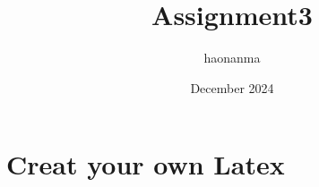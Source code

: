 \documentclass{article}
\title{Assignment3}
\author{haonanma }
\date{December 2024}
\begin{document}
\maketitle

\section{Creat your own Latex}
\end{document}
